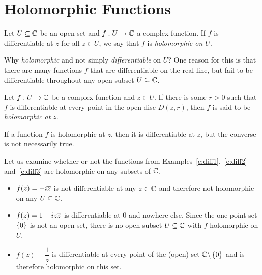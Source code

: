 \section{Holomorphic Functions}

\begin{definition}
Let $U \subseteq \mathbb{C}$ be an open set and $f:U \to \mathbb{C}$ a complex function.  If $f$ is differentiable at $z$ for all $z \in U$, we say that $f$ is \emph{holomorphic on $U$}.
\end{definition}
Why \emph{holomorphic} and not simply \emph{differentiable} on $U$?  One reason for this is that there are many functions $f$ that are differentiable on the real line, but fail to be differentiable throughout any open subset $U \subseteq \mathbb{C}$.


\begin{definition}
Let $f:U \to \mathbb{C}$ be a complex function and $z \in U$.  If there is some $r>0$ such that $f$ is differentiable at every point in the open disc $D(z,r)$, then $f$ is said to be \emph{holomorphic at $z$}.
\end{definition}

If a function $f$ is holomorphic at $z$, then it is differentiable at $z$, but the converse is not necessarily true.


\begin{example}
Let us examine whether or not the functions from Examples~\ref{e:diff1},~\ref{e:diff2} and~\ref{e:diff3} are holomorphic on any subsets of $\mathbb{C}$.
\begin{blankbox}
\begin{itemize}
\item $f(z)=-i\overline{z}$ is not differentiable at any $z \in \mathbb{C}$ and therefore not holomorphic on any $U \subseteq \mathbb{C}$.
\item $f(z) = 1-i z \overline{z}$ is differentiable at $0$ and nowhere else.  Since the one-point set $\left\{0\right\}$ is not an open set, there is no open subset $U \subseteq \mathbb{C}$ with $f$ holomorphic on $U$.
\item $f(z) = \dfrac{1}{z}$ is differentiable at every point of the (open) set $\mathbb{C} \backslash \left\{0\right\}$ and is therefore holomorphic on this set.
\end{itemize}
\end{blankbox}
\end{example}




